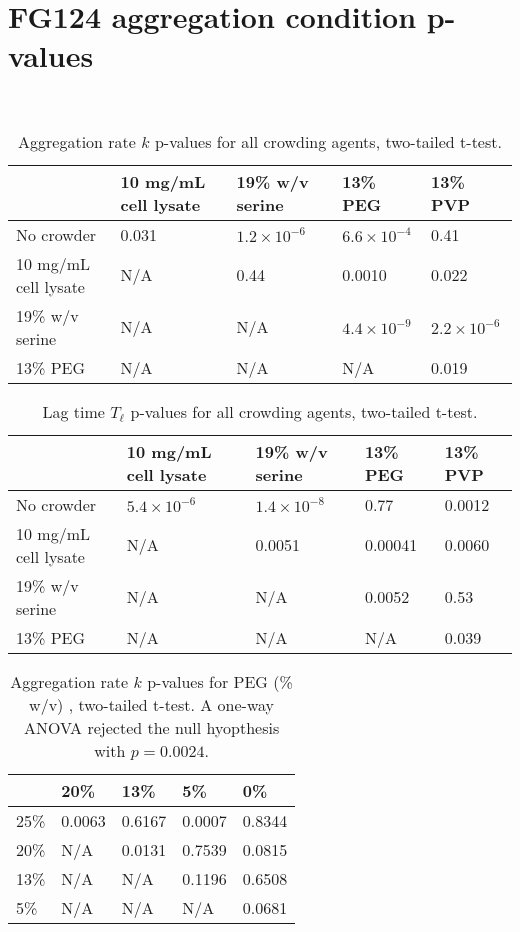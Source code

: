 \chapter{FG124 aggregation condition p-values}~\label{appx:p-values}

\begin{table}[b!]
  \caption[Aggregation rate p-values for all crowding agents.]{Aggregation rate $k$ p-values for all crowding agents, two-tailed t-test.}
    \label{table:p-k-values-all}
    \begin{tabular}{p{4cm}|p{3.5cm}p{3cm}p{2cm}p{2cm}}
        &10 mg/mL cell lysate &  19\% w/v serine & 13\% PEG & 13\% PVP\\
      \hline
	No crowder   & 0.031 & $1.2 \times 10^{-6}$ & $6.6\times 10^{-4}$ &0.41\\
	10 mg/mL cell lysate   & N/A & 0.44 & 0.0010 &  0.022\\
     	19\% w/v serine & N/A  & N/A & $4.4\times 10^{-9}$ & $2.2\times 10^{-6}$\\
      	13\% PEG    & N/A & N/A  & N/A & 0.019\\
    \end{tabular}
\end{table}

\begin{table}[b!]
  \caption[Lag time p-values for all crowding agents.]{Lag time $T_\ell$ p-values for all crowding agents, two-tailed t-test.}
    \label{table:p-tl-values-all}
    \begin{tabular}{p{4cm}|p{3.5cm}p{3cm}p{2cm}p{2cm}}
        &10 mg/mL cell lysate &  19\% w/v serine & 13\% PEG & 13\% PVP\\
      \hline
	No crowder   & $5.4 \times 10^{-6}$ & $1.4 \times 10^{-8}$ & 0.77 &0.0012\\
	10 mg/mL cell lysate   & N/A & 0.0051 & 0.00041 &  0.0060\\
     	19\% w/v serine & N/A  & N/A & 0.0052 & 0.53\\
      	13\% PEG    & N/A & N/A  & N/A & 0.039\\
    \end{tabular}
\end{table}

\begin{table}[b!]
  \caption[Aggregation rate p-values for PEG.]{Aggregation rate $k$ p-values for PEG (\% w/v) , two-tailed t-test. A one-way ANOVA rejected the null hyopthesis with $p=0.0024$.} 
    \label{table:p-k-values-peg}
    \begin{tabular}{p{2cm}|p{3cm}p{3cm}p{3cm}p{3cm}}
        &20\% &  13\% & 5\% & 0\% \\ \hline
	25\% & 0.0063 & 0.6167 & 0.0007 &0.8344\\
	20\% & N/A &0.0131 & 0.7539 & 0.0815\\
     	13\% & N/A  & N/A & 0.1196 & 0.6508\\
      	5\% & N/A & N/A  & N/A & 0.0681\\
    \end{tabular}
\end{table}

